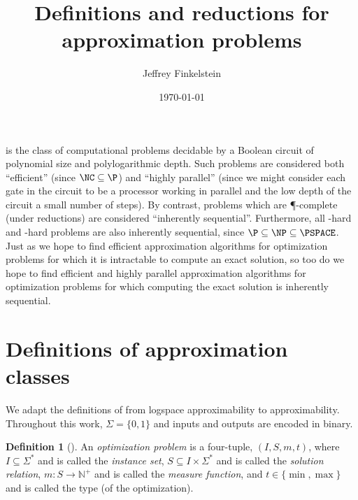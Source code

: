 \documentclass[draft]{article}
\author{Jef{}frey Finkelstein}
\date{\today}
\title{Definitions and reductions for \texorpdfstring{\NC}{NC} approximation problems}
\theoremstyle{definition}
\newtheorem{definition}{Definition}
\begin{document}
\maketitle

\NC{} is the class of computational problems decidable by a Boolean circuit of polynomial size and polylogarithmic depth.
Such problems are considered both ``efficient'' (since $\NC\subseteq\P$) and ``highly parallel'' (since we might consider each gate in the circuit to be a processor working in parallel and the low depth of the circuit a small number of steps).
By contrast, problems which are \P-complete (under \NC{} reductions) are considered ``inherently sequential''.
Furthermore, all \NP-hard and \PSPACE-hard problems are also inherently sequential, since $\P\subseteq\NP\subseteq\PSPACE$.
Just as we hope to find efficient approximation algorithms for optimization problems for which it is intractable to compute an exact solution, so too do we hope to find efficient and highly parallel approximation algorithms for optimization problems for which computing the exact solution is inherently sequential.

\section{Definitions of \texorpdfstring{\NC}{NC} approximation classes}

We adapt the definitions of \cite{tantau07} from logspace approximability to \NC{} approximability.
Throughout this work, $\Sigma=\{0, 1\}$ and inputs and outputs are encoded in binary.

\begin{definition}[\cite{acgkmp99}]
  An \emph{optimization problem} is a four-tuple, $(I, S, m, t)$, where $I\subseteq \Sigma^*$ and is called the \emph{instance set}, $S\subseteq I\times \Sigma^*$ and is called the \emph{solution relation}, $m\colon S\to \mathbb{N}^+$ and is called the \emph{measure function}, and $t\in\{\min, \max\}$ and is called the type (of the optimization).
\end{definition}
\end{document}
